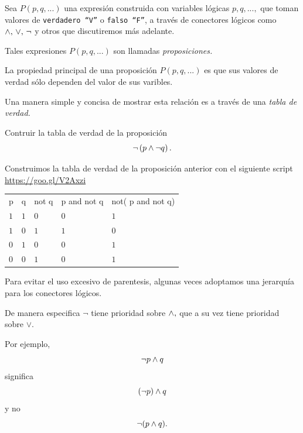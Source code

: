  Sea $P(p,q,...)$ una expresi\'on construida con variables l\'ogicas $p,q,...,$ que toman valores de \texttt{verdadero ``V''} o \texttt{falso ``F''}, a trav\'es de conectores l\'ogicos como $\wedge, \, \vee, \, \neg$ y otros  que discutiremos m\'as adelante.
 
 Tales expresiones $P(p,q,...)$ son llamadas \emph{proposiciones.}

 La propiedad principal de una proposici\'on $P(p,q,...)$ es que sus valores de verdad s\'olo dependen del valor de sus varibles. 
 
 Una manera simple y concisa de mostrar esta relaci\'on es a trav\'es de una \emph{tabla de verdad.}

 \begin{problema}
  Contruir la tabla de verdad de la proposici\'on
  $$\neg \left( p \wedge \neg q \right).$$
 \end{problema}

 Construimos la tabla de verdad de la proposici\'on anterior con el siguiente script \href{https://goo.gl/V2Axzi}{https://goo.gl/V2Axzi}
 
 \begin{tdv}
 	
 	\hfill
	\begin{center}
		  \begin{tabular}{lllll}
			p & q & not q & p and not q & not( p and not q) \\
			$1$ & $1$ & $0$ & $0$ & $1$ \\
			$1$ & $0$ & $1$ & $1$ & $0$ \\
			$0$ & $1$ & $0$ & $0$ & $1$ \\
			$0$ & $0$ & $1$ & $0$ & $1$ \\
		\end{tabular}
	\end{center}
 \end{tdv}




 \begin{rem}
  Para evitar el uso excesivo de parentesis, algunas veces adoptamos una jerarqu\'ia para los conectores l\'ogicos. 
  
  
  De manera especifica $\neg$ tiene prioridad sobre $\wedge,$ que a su vez tiene prioridad sobre $\vee$.
 \end{rem}



 Por ejemplo, $$\neg p \wedge q$$ significa $$\left( \neg p \right) \wedge q$$  y no
 $$
 \neg(p \wedge q).
 $$



